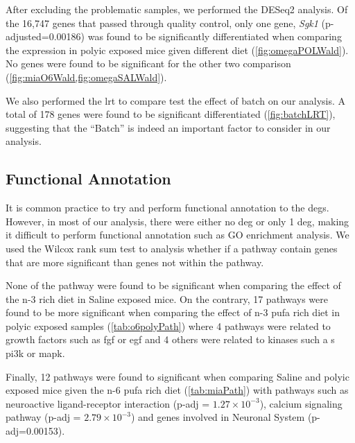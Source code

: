 After excluding the problematic samples, we performed the DESeq2 analysis.
Of the 16,747 genes that passed through quality control, only one gene, \textit{Sgk1} (p-adjusted=0.00186) was found to be significantly differentiated when comparing the expression in \gls{polyic} exposed mice given different diet (\cref{fig:omegaPOLWald}).
No genes were found to be significant for the other two comparison (\cref{fig:miaO6Wald,fig:omegaSALWald}).


We also performed the \gls{lrt} to compare test the effect of batch on our analysis. 
A total of 178 genes were found to be significant differentiated (\cref{fig:batchLRT}), suggesting that the ``Batch'' is indeed an important factor to consider in our analysis.

\subsection{Functional Annotation}
It is common practice to try and perform functional annotation to the \glspl{deg}. 
However, in most of our analysis, there were either no \gls{deg} or only 1 \gls{deg}, making it difficult to perform functional annotation such as \gls{GO} enrichment analysis.
We used the Wilcox rank sum test to analysis whether if a pathway contain genes that are more significant than genes not within the pathway.

None of the pathway were found to be significant when comparing the effect of the n-3 rich diet in Saline exposed mice. 
On the contrary, 17 pathways were found to be more significant when comparing the effect of n-3 \gls{pufa} rich diet in \gls{polyic} exposed samples (\cref{tab:o6polyPath}) where 4 pathways were related to growth factors such as \gls{fgf} or \gls{egf} and 4 others were related to kinases such a s \gls{pi3k} or \gls{mapk}.

Finally, 12 pathways were found to significant when comparing Saline and \gls{polyic} exposed mice given the n-6 \gls{pufa} rich diet (\cref{tab:miaPath}) with pathways such as neuroactive ligand-receptor interaction (p-adj = $1.27\times10^{-3}$), calcium signaling pathway (p-adj = $2.79\times10^{-3}$) and genes involved in Neuronal System (p-adj=0.00153).

